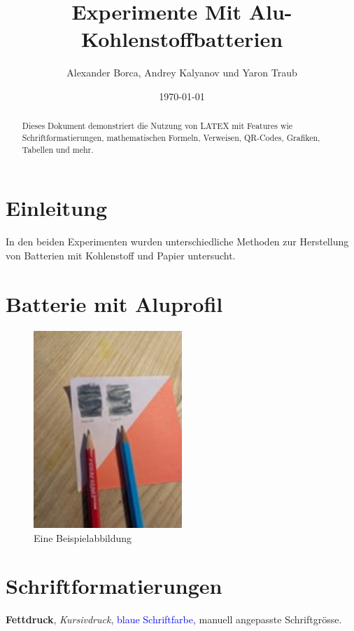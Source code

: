 \documentclass[a4paper,12pt]{article}
\begin{document}
\title{Experimente Mit Alu- Kohlenstoffbatterien}
\author{Alexander Borca, Andrey Kalyanov und Yaron Traub}
\date{\today}
\maketitle

\begin{abstract}
Dieses Dokument demonstriert die Nutzung von LATEX mit Features wie Schriftformatierungen, mathematischen Formeln, Verweisen, QR-Codes, Grafiken, Tabellen und mehr.
\end{abstract}

\tableofcontents
\newpage

\listoffigures
\newpage

\section{Einleitung}
In den beiden Experimenten wurden unterschiedliche Methoden zur Herstellung von Batterien mit Kohlenstoff und Papier untersucht.

\section{Batterie mit Aluprofil}
\begin{figure}[h!]
\centering
\includegraphics[width=0.5\textwidth]{Bild1}
\caption{Eine Beispielabbildung}
\label{fig:beispiel}
\end{figure}

\section{Schriftformatierungen}
\textbf{Fettdruck}, \textit{Kursivdruck}, \textcolor{blue}{blaue Schriftfarbe}, \Large manuell angepasste Schriftgrösse.
\end{document}
